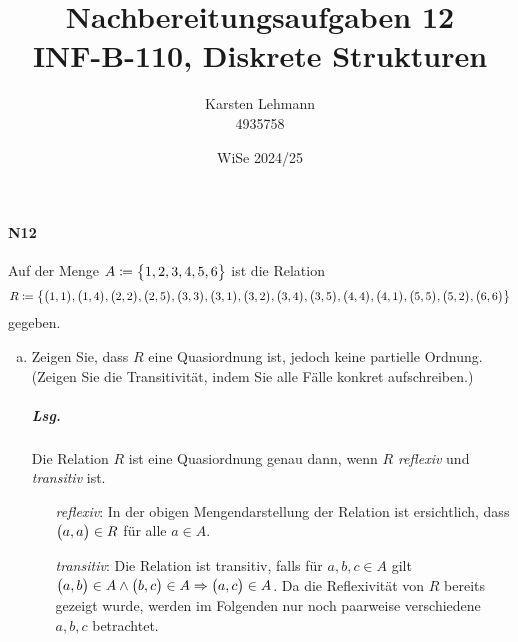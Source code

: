 \documentclass{scrreprt}
\author{Karsten Lehmann \\ 4935758}
\date{WiSe 2024/25}
\title{Nachbereitungsaufgaben 12\\INF-B-110, Diskrete Strukturen}
\begin{document}
\paragraph{N12} Auf der Menge $A \coloneqq \qty\big{1, 2, 3, 4, 5, 6}$ ist die
Relation
\[
  R \coloneqq \qty{
    \qty\big(1, 1),
    \qty\big(1, 4),
    \qty\big(2, 2),
    \qty\big(2, 5),
    \qty\big(3, 3),
    \qty\big(3, 1),
    \qty\big(3, 2),
    \qty\big(3, 4),
    \qty\big(3, 5),
    \qty\big(4, 4),
    \qty\big(4, 1),
    \qty\big(5, 5),
    \qty\big(5, 2),
    \qty\big(6, 6)
  }
\]
gegeben.
\begin{enumerate}[(a)]
\item Zeigen Sie, dass $R$ eine Quasiordnung ist, jedoch keine partielle Ordnung.
  (Zeigen Sie die Transitivität, indem Sie alle Fälle konkret aufschreiben.)

  \subparagraph{Lsg.} Die Relation $R$ ist eine Quasiordnung genau dann, wenn $R$
  \emph{reflexiv} und \emph{transitiv} ist.

  \begin{itemize}
  \item[\emph{reflexiv}:] In der obigen Mengendarstellung der Relation ist
    ersichtlich, dass $\qty\big(a, a) \in R$ für alle $a \in A$.

  \item[\emph{transitiv}:] Die Relation ist transitiv, falls für $a, b, c \in A$
    gilt $\qty\big(a, b) \in A \land \qty\big(b, c) \in A
    \Rightarrow \qty\big(a, c) \in A$.
    Da die Reflexivität von $R$ bereits gezeigt wurde, werden im Folgenden nur
    noch paarweise verschiedene $a, b, c$ betrachtet.


\end{itemize}
\end{enumerate}
\end{document}
